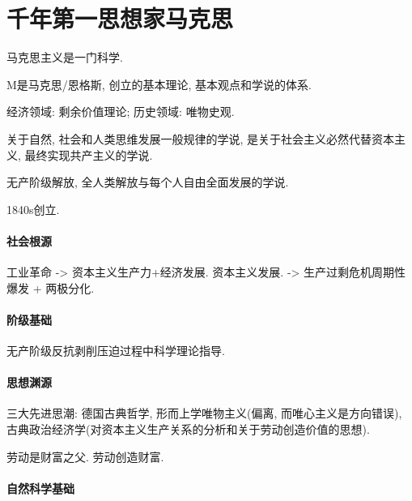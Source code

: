 \documentclass{ctexart}
\begin{document}
\section{千年第一思想家马克思} %
\label{sec:千年第一思想家马克思}

马克思主义是一门科学.\\
\par
\begin{cenum}
    \item M是马克思/恩格斯, 创立的基本理论, 基本观点和学说的体系.
    \item 经济领域: 剩余价值理论; 历史领域: 唯物史观.
    \item 关于自然, 社会和人类思维发展一般规律的学说, 是关于社会主义必然代替资本主义, 最终实现共产主义的学说.
    \item 无产阶级解放, 全人类解放与每个人自由全面发展的学说.
    \item 1840s创立.
\end{cenum}
\paragraph{社会根源} %
\label{par:社会根源}

工业革命 -> 资本主义生产力+经济发展. 资本主义发展. -> 生产过剩危机周期性爆发 + 两极分化.


\paragraph{阶级基础} %
\label{par:阶级基础}

无产阶级反抗剥削压迫过程中科学理论指导.


\paragraph{思想渊源} %
\label{par:思想渊源}

三大先进思潮: 德国古典哲学, 形而上学唯物主义(偏离, 而唯心主义是方向错误), 古典政治经济学(对资本主义生产关系的分析和关于劳动创造价值的思想).
\par
劳动是财富之父. 劳动创造财富.


\paragraph{自然科学基础} %
\label{par:自然科学基础}
\end{document}

